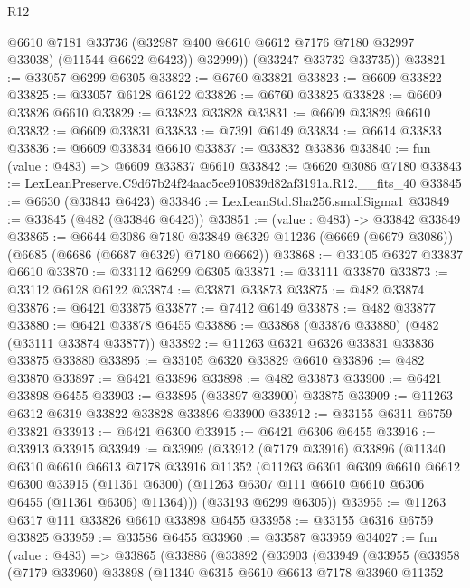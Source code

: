 \begin{lexlean}{R12}
\begin{coremodule}
            @6610
            @7181
            @33736
            (@32987 @400 @6610 @6612 @7176 @7180 @32997 @33038)
            (@11544 @6622 @6423))
          @32999))
      (@33247 @33732 @33735))
@33821 := @33057 @6299 @6305
@33822 := @6760 @33821
@33823 := @6609 @33822
@33825 := @33057 @6128 @6122
@33826 := @6760 @33825
@33828 := @6609 @33826 @6610
@33829 := @33823 @33828
@33831 := @6609 @33829 @6610
@33832 := @6609 @33831
@33833 := @7391 @6149
@33834 := @6614 @33833
@33836 := @6609 @33834 @6610
@33837 := @33832 @33836
@33840 := fun (value : @483) => @6609 @33837 @6610
@33842 := @6620 @3086 @7180
@33843 := LexLeanPreserve.C9d67b24f24aac5ce910839d82af3191a.R12.__fits_40
@33845 := @6630 (@33843 @6423)
@33846 := LexLeanStd.Sha256.smallSigma1
@33849 := @33845 (@482 (@33846 @6423))
@33851 := (value : @483) -> @33842 @33849
@33865 := @6644
    @3086
    @7180
    @33849
    @6329
    @11236
    (@6669 (@6679 @3086))
    (@6685 (@6686 (@6687 @6329) @7180 @6662))
@33868 := @33105 @6327 @33837 @6610
@33870 := @33112 @6299 @6305
@33871 := @33111 @33870
@33873 := @33112 @6128 @6122
@33874 := @33871 @33873
@33875 := @482 @33874
@33876 := @6421 @33875
@33877 := @7412 @6149
@33878 := @482 @33877
@33880 := @6421 @33878 @6455
@33886 := @33868 (@33876 @33880) (@482 (@33111 @33874 @33877))
@33892 := @11263 @6321 @6326 @33831 @33836 @33875 @33880
@33895 := @33105 @6320 @33829 @6610
@33896 := @482 @33870
@33897 := @6421 @33896
@33898 := @482 @33873
@33900 := @6421 @33898 @6455
@33903 := @33895 (@33897 @33900) @33875
@33909 := @11263 @6312 @6319 @33822 @33828 @33896 @33900
@33912 := @33155 @6311 @6759 @33821
@33913 := @6421 @6300
@33915 := @6421 @6306 @6455
@33916 := @33913 @33915
@33949 := @33909
    (@33912
      (@7179 @33916)
      @33896
      (@11340
        @6310
        @6610
        @6613
        @7178
        @33916
        @11352
        (@11263
          @6301
          @6309
          @6610
          @6612
          @6300
          @33915
          (@11361 @6300)
          (@11263 @6307 @111 @6610 @6610 @6306 @6455 (@11361 @6306) @11364)))
      (@33193 @6299 @6305))
@33955 := @11263 @6317 @111 @33826 @6610 @33898 @6455
@33958 := @33155 @6316 @6759 @33825
@33959 := @33586 @6455
@33960 := @33587 @33959
@34027 := fun (value : @483) =>
  @33865
    (@33886
      (@33892
        (@33903
          (@33949
            (@33955
              (@33958
                (@7179 @33960)
                @33898
                (@11340
                  @6315
                  @6610
                  @6613
                  @7178
                  @33960
                  @11352

\end{coremodule}
\end{lexlean}
